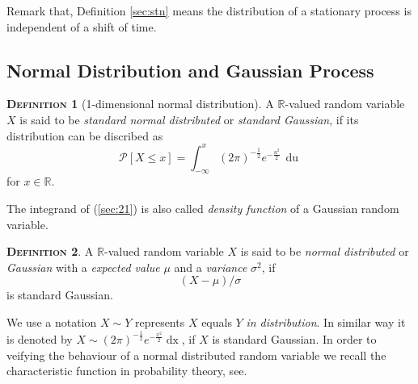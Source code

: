 \documentclass[a4paper, twoside, 11pt]{article}
\theoremstyle{definition}
\newtheorem{definition}{\scshape Definition}[section]
\newcommand{\sqbr}[1]{\left[ {#1} \right]}
\begin{document}
Remark that, Definition \ref{sec:stn} means the distribution of a stationary process is independent of a shift of time.

\subsection{Normal Distribution and  Gaussian Process}
\begin{definition}[1-dimensional normal distribution]
  A $\mathbb{R}$-valued random variable $X$ is said to be \emph{standard normal distributed} or \emph{standard Gaussian}, if its distribution can be discribed as
  \begin{equation}
	\mathcal{P}\sqbr{X \le x} = \int_{-\infty}^{x} (2\pi)^{-\frac{1}{2}}e^{-\frac{u^2}{2}}\,\mathop{du}  
	\label{sec:21}
  \end{equation}
  for $x \in \mathbb{R}$.
\end{definition}
The integrand of (\ref{sec:21}) is also called \emph{density function} of a Gaussian random variable.

\begin{definition}
  A $\mathbb{R}$-valued random variable $X$ is said to be \emph{normal distributed} or \emph{Gaussian} with a \emph{expected value} $\mu$ and a \emph{variance} $\sigma^2$, if
\[
  (X-\mu) / \sigma
\]
is standard Gaussian.
\end{definition}

We use a notation $X \sim Y$ represents $X$ equals $Y$ \emph{in distribution}. In similar way it is denoted by $X \sim (2\pi)^{-\frac{1}{2}}e^{-\frac{x^2}{2}}\mathop{dx} $, if $X$ is standard Gaussian. In order to veifying the behaviour of a normal distributed random variable we recall the characteristic function in probability theory, see\cite{bauer}. 
\end{document}
